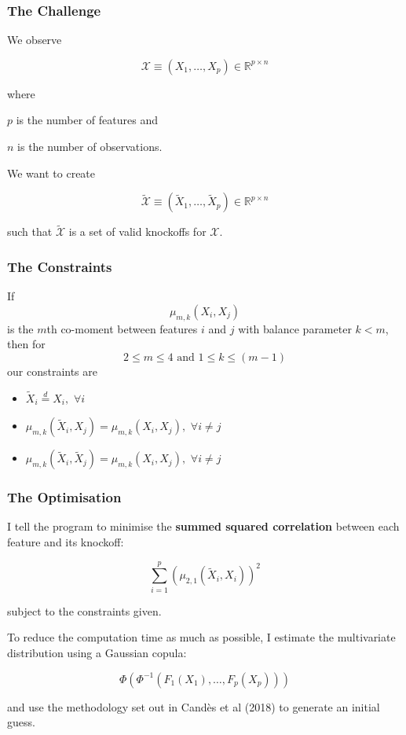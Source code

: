 \documentclass[
	11pt, %
]{beamer}
\begin{document}
\begin{frame}
	\frametitle{The Challenge}
	
	We observe
	
	$$\mathcal{X}\equiv(X_1,\dots,X_p)\in\mathbb{R}^{p\times n}$$
	
	where 
	
	$p$ is the number of features and
	
	$n$ is the number of observations.
	
	\bigskip
	
	We want to create
	
	$$\tilde{\mathcal{X}}\equiv(\tilde{X}_1,\dots,\tilde{X}_p)\in\mathbb{R}^{p\times n}$$
	
	such that $\tilde{\mathcal{X}}$ is a set of valid knockoffs for $\mathcal{X}$.
\end{frame}

\begin{frame}
	\frametitle{The Constraints}
	If $$\mu_{m,k}(X_i,X_j)$$ is the $m$th co-moment between features $i$ and $j$ with balance parameter $k<m$, then for $$2\le m\le 4\text{ and }1 \le k\le (m-1)$$ our constraints are

	\begin{itemize}
		\item $\tilde{X}_i \stackrel{d}{=} X_i, \,\, \forall i$
		\item $\mu_{m,k}(\tilde{X}_i,X_j)=\mu_{m,k}(X_i,X_j),\,\, \forall i\ne j$
		\item $\mu_{m,k}(\tilde{X}_i,\tilde{X}_j)=\mu_{m,k}(X_i,X_j),\,\, \forall i\ne j$
	\end{itemize}
\end{frame}

\begin{frame}
	\frametitle{The Optimisation}
	
	I tell the program to minimise the \textbf{summed squared correlation} between each feature and its knockoff:
	
	$$\sum_{i=1}^p \left(\mu_{2,1}(\tilde{X}_i,X_i)\right)^2$$
	
	subject to the constraints given.
	
	\bigskip
	
	To reduce the computation time as much as possible, I estimate the multivariate distribution using a Gaussian copula:
	
	$$\Phi\left(\Phi^{-1}\left(F_1(X_1),\dots,F_p(X_p)\right)\right)$$
	
	and use the methodology set out in Cand\`{e}s et al (2018) to generate an initial guess. 
\end{frame}
\end{document}
